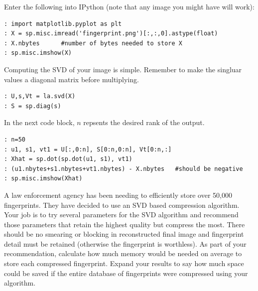 \begin{python}
Enter the following into IPython (note that any image you might have will work):
\begin{lstlisting}
: import matplotlib.pyplot as plt
: X = sp.misc.imread('fingerprint.png')[:,:,0].astype(float)
: X.nbytes      #number of bytes needed to store X
: sp.misc.imshow(X)
\end{lstlisting}
Computing the SVD of your image is simple.  Remember to make the singluar values a diagonal matrix before multiplying.
\begin{lstlisting}
: U,s,Vt = la.svd(X)
: S = sp.diag(s)
\end{lstlisting}
In the next code block, $n$ repsents the desired rank of the output.
\begin{lstlisting}
: n=50
: u1, s1, vt1 = U[:,0:n], S[0:n,0:n], Vt[0:n,:]
: Xhat = sp.dot(sp.dot(u1, s1), vt1)
: (u1.nbytes+s1.nbytes+vt1.nbytes) - X.nbytes   #should be negative
: sp.misc.imshow(Xhat)
\end{lstlisting}

\begin{problem}
A law enforcement agency has been needing to efficiently store over 50,000 fingerprints.  They have decided to use an SVD based compression algorithm.  Your job is to try several parameters for the SVD algorithm and recommend those parameters that retain the highest quality but compress the most.  There should be no smearing or blocking in reconstructed final image and fingerprint detail must be retained (otherwise the fingerprint is worthless).  As part of your recommendation, calculate how much memory would be needed on average to store each compressed fingerprint.  Expand your results to say how much space could be saved if the entire database of fingerprints were compressed using your algorithm.
\end{problem}
\end{python}
